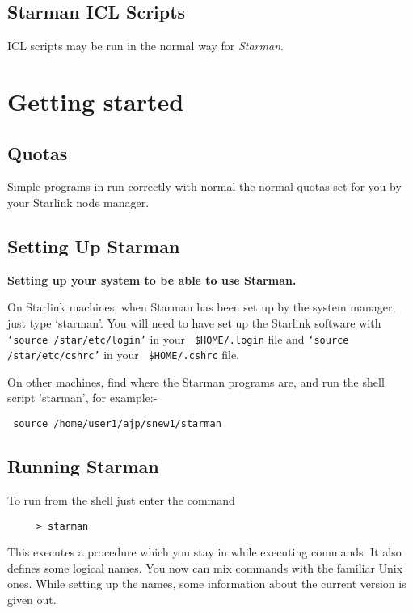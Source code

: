 \subsection{Starman ICL Scripts}

{\small ICL} scripts may be run in the normal way for {\it Starman}.



\section{Getting started}

\subsection{Quotas}

Simple programs in \starman run correctly with normal the normal quotas
set for you by your Starlink node manager.

\subsection{Setting Up Starman}

  {\bf \hspace*{2ex} Setting up your system to be able to use Starman.}

On Starlink machines, when Starman has been set up by the system
manager, just type `starman'.  You will need to have set up the
Starlink software with {\tt `source /star/etc/login'} in your {\tt
\$HOME/.login} file and {\tt `source /star/etc/cshrc'} in your {\tt
\$HOME/.cshrc} file.

On other machines, find where the Starman programs are, and run the
shell script 'starman', for example:-

      \verb# source /home/user1/ajp/snew1/starman #

\subsection{Running Starman}

To run \starman from the shell just enter the command

\begin{verbatim}
     > starman
\end{verbatim}

This executes a procedure which you stay in while executing \starman
commands. It also defines some logical names. You now can mix \starman
commands with the familiar {\small Unix } ones.  While setting up the
names, some information about the current version is given out.

